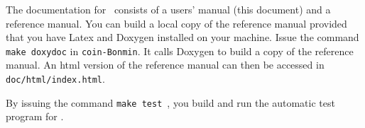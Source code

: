 The documentation for \Bonmin\ consists of a users' manual (this document) and a reference manual.
You can build a local copy of the reference manual provided that you have Latex
and Doxygen installed on your machine. Issue the command {\tt make
doxydoc} in {\tt coin-Bonmin}. It calls Doxygen to build a copy of the
reference manual. An html version of the reference manual can then
be accessed in {\tt doc/html/index.html}.


By issuing the command {\tt make test}~, you build and run the automatic test program for \Bonmin.
